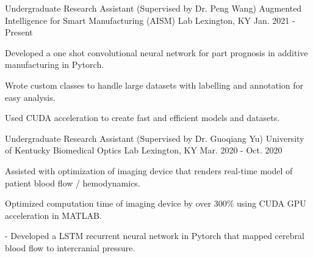

\begin{cventries}

  \cventry
    {Undergraduate Research Assistant (Supervised by Dr. Peng Wang)} %
    {Augmented Intelligence for Smart Manufacturing (AISM) Lab} %
    {Lexington, KY} %
    {Jan. 2021 - Present} %
    {
      \begin{cvitems} %
        \item {Developed a one shot convolutional neural network for part prognosis in additive manufacturing in Pytorch.}
        \item {Wrote custom classes to handle large datasets with labelling and annotation for easy analysis.}
        \item {Used CUDA acceleration to create fast and efficient models and datasets.}
      \end{cvitems}
    }

  \cventry
    {Undergraduate Research Assistant (Supervised by Dr. Guoqiang Yu)} %
    {University of Kentucky Biomedical Optics Lab} %
    {Lexington, KY} %
    {Mar. 2020 - Oct. 2020} %
    {
      \begin{cvitems} %
        \item {Assisted with optimization of imaging device that renders real-time model of patient blood flow / hemodynamics.}
        \item {Optimized computation time of imaging device by over 300\% using CUDA GPU acceleration in MATLAB.}
        \item {-	Developed a LSTM recurrent neural network in Pytorch that mapped cerebral blood flow to intercranial pressure.}
      \end{cvitems}
    }
\end{cventries}
